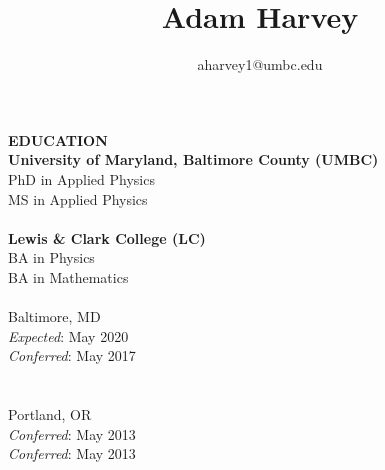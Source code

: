 \documentclass{article}
\begin{document}
\singlespacing



\title{Adam Harvey}
\author{aharvey1@umbc.edu}


\maketitle
\begin{vwcol}[widths={0.8,0.2}, sep=.8cm, justify=flush, rule=0pt, indent=0em]
\noindent\textbf{EDUCATION}\\
\textbf{University of Maryland, Baltimore County (UMBC)}\\
PhD in Applied Physics\\
MS in Applied Physics\\
\\
\textbf{Lewis \& Clark College (LC)}\\
BA in Physics\\
BA in Mathematics\\
\newpage
\phantom \\
\noindent Baltimore, MD\\
\emph{Expected}: May 2020\\
\emph{Conferred}: May 2017\\
\\
\\
Portland, OR\\
\emph{Conferred}: May 2013\\
\emph{Conferred}: May 2013
\end{vwcol}
\phantom \\
\end{document}
